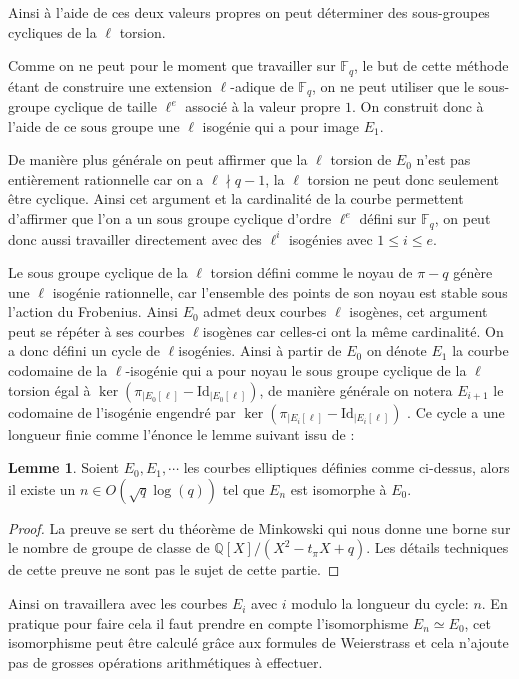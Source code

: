 \documentclass[10pt,a4paper]{book}
\theoremstyle{plain}
\theoremstyle{definition}
\newtheorem{lem}[thm]{Lemme}
\theoremstyle{definition}
\theoremstyle{definition}
\theoremstyle{definition}
\theoremstyle{remark}
\theoremstyle{remark}
\begin{document}
Ainsi à l'aide de ces deux valeurs propres on peut déterminer des sous-groupes cycliques de la $\ell$ torsion. 

Comme on ne peut pour le moment que travailler sur $\mathbb{F}_q$, le but de cette méthode étant de construire une extension $\ell$-adique de $\mathbb{F}_q$, on ne peut utiliser que le sous-groupe cyclique de taille $\ell^e$ associé à la valeur propre $1$. On construit donc à l'aide de ce sous groupe une $\ell$ isogénie qui a pour image $E_1$. 

De manière plus générale  on peut affirmer que la $\ell$ torsion de $E_0$ n'est pas entièrement rationnelle car on a $\ell \nmid q-1$, la $\ell$ torsion ne peut donc seulement être cyclique. Ainsi cet argument et la cardinalité de la courbe permettent d'affirmer que l'on a un sous groupe cyclique d'ordre $\ell^e$ défini sur $\mathbb{F}_q$, on peut donc aussi travailler directement avec des $\ell^i$ isogénies avec $1 \leqslant i \leqslant e$.

Le sous groupe cyclique de la $\ell$ torsion défini comme le noyau de $\pi -q$ génère une $\ell$ isogénie rationnelle, car l'ensemble des points de son noyau est stable sous l'action du Frobenius. Ainsi $E_0$ admet deux courbes $\ell$ isogènes, cet argument peut se répéter à ses courbes $\ell$isogènes car celles-ci ont la même cardinalité. On a donc défini un cycle de $\ell$isogénies. Ainsi à partir de $E_0$ on dénote $E_1$ la courbe codomaine de la $\ell$-isogénie qui a pour noyau le sous groupe cyclique de la $\ell$ torsion égal à $\ker (\pi_{|E_0[\ell]} - \mathrm{Id}_{|E_0[\ell]})$, de manière générale on notera $E_{i+1}$ le codomaine de l'isogénie engendré par $\ker (\pi_{|E_i[\ell]} - \mathrm{Id}_{|E_i[\ell]})$ . Ce cycle a une longueur finie comme l'énonce le lemme suivant issu de \cite{DeFeo-Doliskani-Schost13}:

\begin{lem}
Soient $E_0,E_1, \cdots$ les courbes elliptiques définies comme ci-dessus, alors il existe un $n \in O(\sqrt{q}\log(q))$ tel que $E_n$ est isomorphe à $E_0$.
\end{lem}

\begin{proof}
La preuve se sert du théorème de Minkowski qui nous donne une borne sur le nombre de groupe de classe de $\mathbb{Q}[X]/(X^2-t_{\pi}X+q)$. Les détails techniques de cette preuve ne sont pas le sujet de cette partie.
\end{proof}

Ainsi on travaillera avec les courbes $E_i$ avec $i$ modulo la longueur du cycle: $n$. En pratique pour faire cela il faut prendre en compte l'isomorphisme $E_n \simeq E_0$, cet isomorphisme peut être calculé grâce aux formules de Weierstrass et cela n'ajoute pas de grosses opérations arithmétiques à effectuer.
\end{document}
